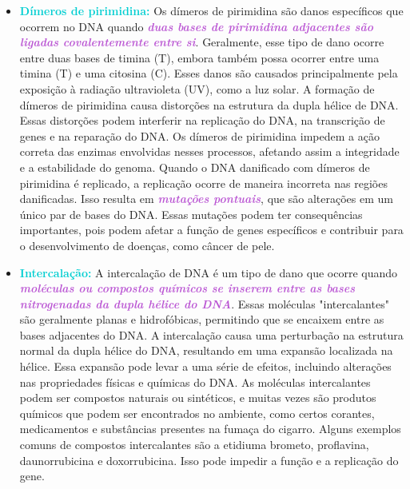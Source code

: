 \documentclass[11pt,a4paper]{article}
\newcounter{exemplo}
\begin{document}
\begin{itemize}[label=\textcolor{CarnationPink}{$\blacktriangleright$}]
		\item \textcolor{DarkTurquoise}{\textbf{Dímeros de pirimidina:}} Os dímeros de pirimidina são danos específicos que ocorrem no DNA quando \textcolor{MediumOrchid}{\textbf{\textit{duas bases de pirimidina adjacentes são ligadas covalentemente entre si}}}. Geralmente, esse tipo de dano ocorre entre duas bases de timina (T), embora também possa ocorrer entre uma timina (T) e uma citosina (C). Esses danos são causados principalmente pela exposição à radiação ultravioleta (UV), como a luz solar. A formação de dímeros de pirimidina causa distorções na estrutura da dupla hélice de DNA. Essas distorções podem interferir na replicação do DNA, na transcrição de genes e na reparação do DNA. Os dímeros de pirimidina impedem a ação correta das enzimas envolvidas nesses processos, afetando assim a integridade e a estabilidade do genoma. Quando o DNA danificado com dímeros de pirimidina é replicado, a replicação ocorre de maneira incorreta nas regiões danificadas. Isso resulta em \textcolor{MediumOrchid}{\textbf{\textit{mutações pontuais}}}, que são alterações em um único par de bases do DNA. Essas mutações podem ter consequências importantes, pois podem afetar a função de genes específicos e contribuir para o desenvolvimento de doenças, como câncer de pele.
		
    \item \textcolor{DarkTurquoise}{\textbf{Intercalação:}} A intercalação de DNA é um tipo de dano que ocorre quando \textcolor{MediumOrchid}{\textbf{\textit{moléculas ou compostos químicos se inserem entre as bases nitrogenadas da dupla hélice do DNA}}}. Essas moléculas "intercalantes" são geralmente planas e hidrofóbicas, permitindo que se encaixem entre as bases adjacentes do DNA. A intercalação causa uma perturbação na estrutura normal da dupla hélice do DNA, resultando em uma expansão localizada na hélice. Essa expansão pode levar a uma série de efeitos, incluindo alterações nas propriedades físicas e químicas do DNA. As moléculas intercalantes podem ser compostos naturais ou sintéticos, e muitas vezes são produtos químicos que podem ser encontrados no ambiente, como certos corantes, medicamentos e substâncias presentes na fumaça do cigarro. Alguns exemplos comuns de compostos intercalantes são a etidiuma brometo, proflavina, daunorrubicina e doxorrubicina. Isso pode impedir a função e a replicação do gene.
    

\end{itemize}
\end{document}
